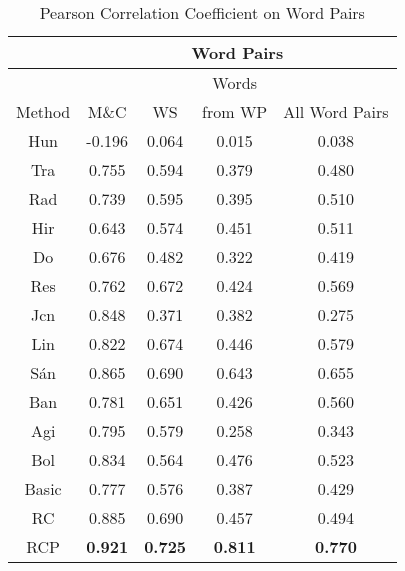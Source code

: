 \begin{table}[th]
\centering
\caption{Pearson Correlation Coefficient on Word Pairs}
\label{tab:benchmarkData1}
\small{
\begin{tabular}{|c|c|c|c|c|}\hline
&	\multicolumn{4}{c|}{Word Pairs} \\\hline
	&	& & Words &  \\ %
Method	&M\&C &WS & from WP & All Word Pairs  \\ \hline\hline %
Hun	&-0.196	&0.064 &0.015&0.038 \\ \hline %
Tra	&0.755	&0.594 &0.379&0.480 \\ \hline %
Rad&0.739	&0.595&0.395&0.510\\ \hline %
Hir	&0.643	&0.574&0.451&0.511\\ \hline %
Do	&0.676	&0.482&0.322&0.419\\ \hline %
Res&0.762	&0.672&0.424&0.569\\ \hline %
Jcn&0.848	&0.371&0.382&0.275\\ \hline %
Lin&0.822	&0.674&0.446&0.579\\ \hline %
S\'{a}n&0.865	&0.690	&0.643&0.655\\ \hline %
Ban&0.781	&0.651&0.426&0.560\\ \hline %
Agi&0.795	&0.579&0.258&0.343\\ \hline %
Bol&0.834	&0.564& 0.476&0.523\\ \hline %
Basic&0.777	&0.576 &0.387&0.429\\ \hline %
RC	&0.885	&0.690 &0.457&0.494\\ \hline %
RCP&\textbf{0.921}&\textbf{0.725} &\textbf{0.811}&\textbf{0.770}\\ \hline %
\end{tabular}
}
\end{table}

